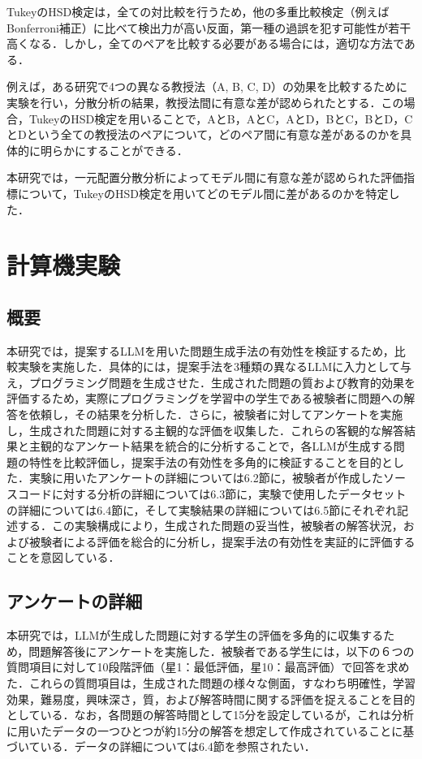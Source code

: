 \documentclass[11pt]{jreport}
\begin{document}
TukeyのHSD検定は，全ての対比較を行うため，他の多重比較検定（例えばBonferroni補正）に比べて検出力が高い反面，第一種の過誤を犯す可能性が若干高くなる．しかし，全てのペアを比較する必要がある場合には，適切な方法である．

例えば，ある研究で4つの異なる教授法（A, B, C, D）の効果を比較するために実験を行い，分散分析の結果，教授法間に有意な差が認められたとする．この場合，TukeyのHSD検定を用いることで，AとB，AとC，AとD，BとC，BとD，CとDという全ての教授法のペアについて，どのペア間に有意な差があるのかを具体的に明らかにすることができる．

本研究では，一元配置分散分析によってモデル間に有意な差が認められた評価指標について，TukeyのHSD検定を用いてどのモデル間に差があるのかを特定した．


\chapter{計算機実験}
\section{概要}
本研究では，提案するLLMを用いた問題生成手法の有効性を検証するため，比較実験を実施した．具体的には，提案手法を3種類の異なるLLMに入力として与え，プログラミング問題を生成させた．生成された問題の質および教育的効果を評価するため，実際にプログラミングを学習中の学生である被験者に問題への解答を依頼し，その結果を分析した．さらに，被験者に対してアンケートを実施し，生成された問題に対する主観的な評価を収集した．これらの客観的な解答結果と主観的なアンケート結果を統合的に分析することで，各LLMが生成する問題の特性を比較評価し，提案手法の有効性を多角的に検証することを目的とした．実験に用いたアンケートの詳細については6.2節に，被験者が作成したソースコードに対する分析の詳細については6.3節に，実験で使用したデータセットの詳細については6.4節に，そして実験結果の詳細については6.5節にそれぞれ記述する．この実験構成により，生成された問題の妥当性，被験者の解答状況，および被験者による評価を総合的に分析し，提案手法の有効性を実証的に評価することを意図している．
\section{アンケートの詳細}
本研究では，LLMが生成した問題に対する学生の評価を多角的に収集するため，問題解答後にアンケートを実施した．被験者である学生には，以下の６つの質問項目に対して10段階評価（星1：最低評価，星10：最高評価）で回答を求めた．これらの質問項目は，生成された問題の様々な側面，すなわち明確性，学習効果，難易度，興味深さ，質，および解答時間に関する評価を捉えることを目的としている．なお，各問題の解答時間として15分を設定しているが，これは分析に用いたデータの一つひとつが約15分の解答を想定して作成されていることに基づいている．データの詳細については6.4節を参照されたい．
\end{document}
